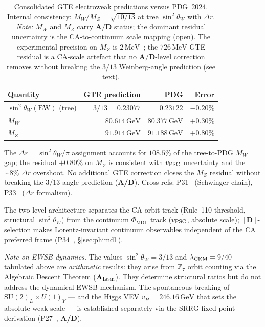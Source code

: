 \documentclass[11pt]{article}
\theoremstyle{remark}
\newcommand{\sinwsq}{\sin^2\!\theta_W}
\newcommand{\lam}{\lambda}
\newcommand{\CatAL}{\ensuremath{\textbf{A}_{\rm Lean}}}
\newcommand{\CatAD}{\textbf{A/D}}
\begin{document}
\begin{table}[htbp]
\centering
\small
\caption{Consolidated GTE electroweak predictions versus PDG~2024.
  Internal consistency: $M_W/M_Z = \sqrt{10/13}$ at tree $\sinwsq$ with $\Delta r$.
  \emph{Note:} $M_W$ and $M_Z$ carry $\CatAD$ status; the dominant residual uncertainty
  is the CA-to-continuum scale mapping (open). The experimental precision on
  $M_Z$ is $2\,\text{MeV}$~\cite{ParticleDataGroup2022}; the $726\,\text{MeV}$ GTE residual
  is a CA-scale artefact that no $\CatAD$-level correction removes without breaking
  the $3/13$ Weinberg-angle prediction (see text).}
\label{tab:ew_consolidated}
\begin{tabular}{@{}lrrr@{}}
\toprule
Quantity & GTE prediction & PDG & Error \\
\midrule
$\sinwsq(\text{EW})$ (tree) & $3/13 = 0.23077$ & $0.23122$ & $-0.20\%$ \\
$M_W$ & $80.614\,\text{GeV}$ & $80.377\,\text{GeV}$ & $+0.30\%$ \\
$M_Z$ & $91.914\,\text{GeV}$ & $91.188\,\text{GeV}$ & $+0.80\%$ \\
\bottomrule
\end{tabular}
\end{table}

The $\Delta r = \sinwsq/\pi$ assignment accounts for $108.5\%$ of the tree-to-PDG
$M_W$ gap; the residual $+0.80\%$ on $M_Z$ is consistent with $v_{\rm PSC}$
uncertainty and the $\sim 8\%$ $\Delta r$ overshoot.
No additional GTE correction closes the $M_Z$ residual without breaking the
$3/13$ angle prediction (\CatAD).
Cross-refs: P31~\cite{SpivackWeinbergAngle} (Schwinger chain), P33~\cite{SpivackDeeperConsequences}
($\Delta r$ formalism).

The two-level architecture separates the CA orbit track (Rule~110 threshold,
structural $\sinwsq$) from the continuum $\Phi_{\mathrm{MDL}}$ track
($v_{\rm PSC}$, absolute scale); $[\mathbf{D}]$-selection makes Lorentz-invariant
continuum observables independent of the CA preferred frame
(P34~\cite{SpivackGTEMobius}, \S\ref{sec:phimdl}).

\noindent\textit{Note on EWSB dynamics.}\enspace
The values $\sinwsq = 3/13$ and $\lam_{\rm CKM} = 9/40$ tabulated above are
\emph{arithmetic} results: they arise from $\mathbb{Z}_7$ orbit counting via the
Algebraic Descent Theorem (\CatAL).  They determine structural ratios but do not
address the dynamical EWSB mechanism.  The spontaneous breaking of
$\mathrm{SU}(2)_L\times U(1)_Y$ --- and the Higgs VEV $v_H = 246.16\,\text{GeV}$
that sets the absolute weak scale --- is established separately via the SRRG
fixed-point derivation (P27~\cite{SpivackSRRG}, \CatAD).
\end{document}
